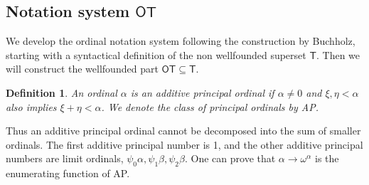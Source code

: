 \documentclass{amsart}
\theoremstyle{plain}
\theoremstyle{plain}
\newtheorem*{definition}{Definition}
\newcommand\T{\mathsf{T}}
\newcommand\OT{\mathsf{OT}}
\newcommand{\al}{{\alpha}}
\newcommand{\be}{{\beta}}
\newcommand{\om}{\omega}
\begin{document}



\subsection{Notation system \texorpdfstring{$\OT$}{OT}}\label{subsec:NotationSys}

We develop the ordinal notation system following the construction by Buchholz, starting with a syntactical definition of the non wellfounded superset $\T$. Then we will construct the wellfounded part $\OT \subseteq \T$.

\begin{definition}
    An ordinal $\al$ is an {\em additive principal ordinal} if $\al\neq 0$ and  $\xi, \eta <\al$ also implies $\xi+\eta<\al$. We denote the class of principal ordinals by AP.
\end{definition}
Thus an additive principal ordinal cannot be decomposed into the sum of smaller ordinals. The first additive principal number is 1, and the other additive principal numbers are limit ordinals, $\psi_0\al, \psi_1\be, \psi_2\be$. One can prove that $\al \rightarrow \om^\al$ is the enumerating function of AP.
\end{document}
